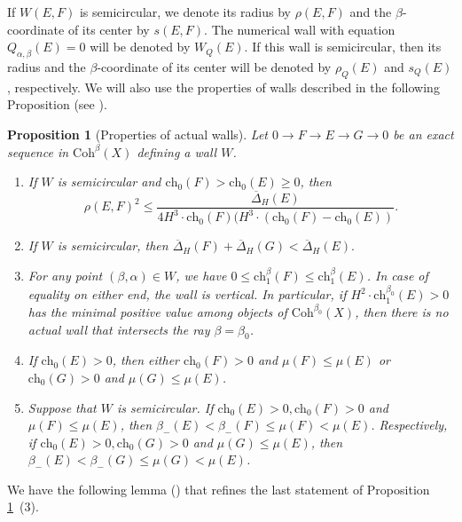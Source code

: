 \documentclass{amsart}
\newtheorem{proposition}[theorem]{Proposition}
\begin{document}
	If $W(E,F)$ is semicircular, we denote its radius by $\rho(E,F)$ 
	and the $\beta$-coordinate of its center by $s(E,F)$. The numerical wall with equation $Q_{\alpha,\beta}(E)=0$ will be denoted by $W_Q(E)$. If this wall is semicircular, then its radius and the $\beta$-coordinate of its center will be denoted by $\rho_Q(E)$ and $s_Q(E)$, respectively. 
	We will also use the properties of walls described in the following Proposition (see \cite[Proposition 2.4]{Vass}).
	
	\begin{proposition}[Properties of actual walls]\label{actual}Let $0\to F\to E\to G\to 0$ be an exact sequence in $\mathrm{Coh}^\beta(X)$ defining a wall $W$.
		\begin{enumerate}
			\item If $W$ is semicircular and $\mathrm{ch}_0(F)>\mathrm{ch}_0(E)\ge 0$, then
			$$\rho(E,F)^2\le\frac{\overline{\Delta}_H(E)}{4H^3\cdot\mathrm{ch}_0(F)(H^3\cdot(\mathrm{ch}_0(F)-\mathrm{ch}_0(E))}.$$
			\item If $W$ is semicircular, then $\overline{\Delta}_H(F)+\overline{\Delta}_H(G)<\overline{\Delta}_H(E).$
			\item For any point $(\beta,\alpha)\in W$, we have $0\le\mathrm{ch}_1^\beta(F)\le\mathrm{ch}_1^\beta(E)$. In case of equality on either end, the wall is vertical. In particular, if $H^2\cdot\mathrm{ch}_1^{\beta_0}(E)>0$ has the minimal positive value among objects of $\mathrm{Coh}^{\beta_0}(X)$, then there is no actual wall that intersects the ray $\beta=\beta_0$.
			\item If $\mathrm{ch}_0(E)>0$, then either $\mathrm{ch}_0(F)>0$ and $\mu(F)\le\mu(E)$ or $\mathrm{ch}_0(G)>0$ and $\mu(G)\le\mu(E)$. 
			\item Suppose that $W$ is semicircular. If $\mathrm{ch}_0(E)>0, \mathrm{ch}_0(F)>0$ and $\mu(F)\le\mu(E)$, then $\beta_-(E)<\beta_-(F)\le\mu(F)<\mu(E)$. Respectively, if $\mathrm{ch}_0(E)>0, \mathrm{ch}_0(G)>0$ and $\mu(G)\le\mu(E)$, then $\beta_-(E)<\beta_-(G)\le\mu(G)<\mu(E)$. 
		\end{enumerate}
	\end{proposition}
	
	We have the following lemma (\cite[Lemma 3.5]{Sch19}) that refines the last statement of Proposition \ref{actual}~(3).
	
\end{document}
